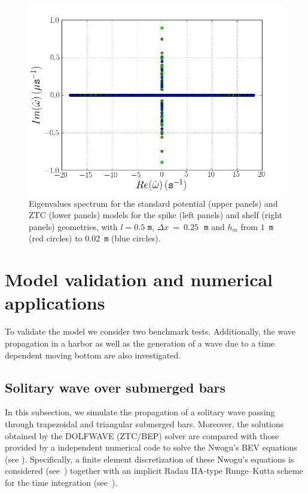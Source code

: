 \begin{figure}
\begin{center}
\includegraphics[type=png,ext=.png,read=.png,width=\smallfig]{chapters/lopes/png/L_0.5_dx_0.25_hm_shelf_spectrum_Zhao}
\end{center}
\caption{Eigenvalues spectrum for the standard potential
 (upper panels) and ZTC (lower panels)
 models for the spike (left panels) and
 shelf (right panels) geometries, with  $l=0.5$ {\tt m},
 $\Delta x~=~0.25$\,~{\tt m} and $h_m$ from $1$~{\tt m} (red circles)
 to $0.02$~{\tt m} (blue circles).}
 \label{fig:lopes:spectrumhm3}
 \end{figure}


\section{Model validation and numerical applications}\label{sec:lopes:numericaltests}
To validate the model  we consider two benchmark tests.
Additionally, the wave propagation in a harbor as well as the
generation of a wave due to a time dependent  moving bottom
are also investigated.

\subsection{Solitary wave over  submerged bars}
In this subsection, we simulate the propagation of a
solitary wave passing through  trapezoidal and  triangular
submerged bars.
Moreover,
the solutions obtained by the DOLFWAVE (ZTC/BEP) solver are
compared with those provided by a \fenics independent
numerical code to solve the Nwogu's BEV equations (see
).  Specifically, a finite element
discretization of these Nwogu's equations is considered
(see~\citet{Walkley1999}) together with an
implicit Radau IIA-type Runge--Kutta scheme
 for the time integration (see~\citet{HairerWanner1991b}).



